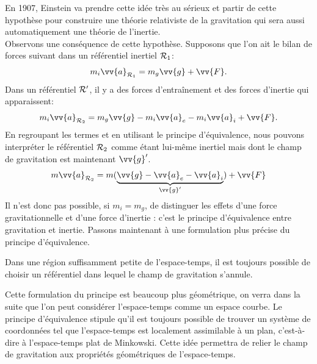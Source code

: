 \documentclass[a4paper,11pt]{report}
\begin{document}
            En 1907, Einstein va prendre cette idée très au sérieux et partir de cette hypothèse pour construire une théorie relativiste de la gravitation qui sera aussi automatiquement une théorie de l'inertie.\\
            
            Observons une conséquence de cette hypothèse. Supposons que l'on ait le bilan de forces suivant dans un référentiel inertiel $\mathcal{R}_1$:
            \begin{equation}
                m_i\vv{a}_{\R_1} = m_g\vv{g} + \vv{F}.
            \end{equation}
            Dans un référentiel $\mathcal{R}'$, il y a des forces d'entraînement et des forces d'inertie qui apparaissent:
            \begin{equation}
                m_i\vv{a}_{\R_2} = m_g\vv{g} -m_i\vv{a}_e-m_i\vv{a}_i + \vv{F}.
            \end{equation}
            En regroupant les termes et en utilisant le principe d'équivalence, nous pouvons interpréter le référentiel $\mathcal{R}_2$ comme étant lui-même inertiel mais dont le champ de gravitation est maintenant $\vv{g}'$.
            \begin{equation}
                m\vv{a}_{\R_2} = m(\underbrace{\vv{g} -\vv{a}_e-\vv{a}_i}_{\vv{g}'}) + \vv{F}
            \end{equation}
            Il n'est donc pas possible, si $m_i=m_g$, de distinguer les effets d'une force gravitationnelle et d'une force d'inertie : c'est le principe d'équivalence entre gravitation et inertie. Passons maintenant à une formulation plus précise du principe d'équivalence.
            
            \begin{prin}
            \begin{leftbar}
                Dans une région suffisamment petite de l'espace-temps, il est toujours possible de choisir un référentiel dans lequel le champ de gravitation s'annule.
            \end{leftbar}
            \end{prin}
        
            Cette formulation du principe est beaucoup plus géométrique, on verra dans la suite que l'on peut considérer l'espace-temps comme un espace courbe. Le principe d'équivalence stipule qu'il est toujours possible de trouver un système de coordonnées tel que l'espace-temps est localement assimilable à un plan, c'est-à-dire à l'espace-temps plat de Minkowski. Cette idée permettra de relier le champ de gravitation aux propriétés géométriques de l'espace-temps.
        
\end{document}
